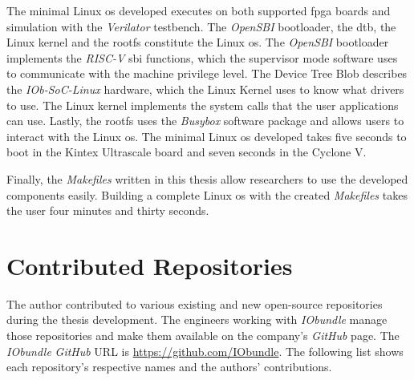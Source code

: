The minimal Linux \acrshort{os} developed executes on both supported \acrshort{fpga} boards and simulation with the \textit{Verilator} testbench. The \textit{OpenSBI} bootloader, the \acrlong{dtb}, the Linux kernel and the \acrlong{rootfs} constitute the Linux \acrshort{os}. The \textit{OpenSBI} bootloader implements the \textit{RISC-V} \acrshort{sbi} functions, which the supervisor mode software uses to communicate with the machine privilege level. The Device Tree Blob describes the \textit{IOb-SoC-Linux} hardware, which the Linux Kernel uses to know what drivers to use. The Linux kernel implements the system calls that the user applications can use. Lastly, the \acrlong{rootfs} uses the \textit{Busybox} software package and allows users to interact with the Linux \acrshort{os}. The minimal Linux \acrshort{os} developed takes five seconds to boot in the Kintex Ultrascale board and seven seconds in the Cyclone V.

Finally, the \textit{Makefiles} written in this thesis allow researchers to use the developed components easily. Building a complete Linux \acrshort{os} with the created \textit{Makefiles} takes the user four minutes and thirty seconds.

\section{Contributed Repositories}
\label{section:contributions}
The author contributed to various existing and new open-source repositories during the thesis development. The engineers working with \textit{IObundle} manage those repositories and make them available on the company's \textit{GitHub} page. The \textit{IObundle} \textit{GitHub} URL is \url{https://github.com/IObundle}. The following list shows each repository's respective names and the authors' contributions.

